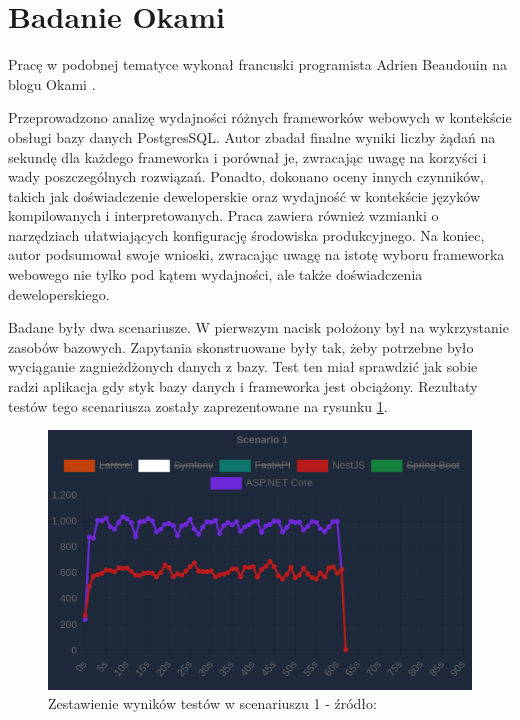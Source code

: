 \section{Badanie Okami}
Pracę w podobnej tematyce wykonał francuski programista Adrien Beaudouin na blogu Okami \cite{okami1012024Benchmark}.

Przeprowadzono analizę wydajności różnych frameworków webowych w kontekście obsługi bazy danych PostgresSQL.
Autor zbadał finalne wyniki liczby żądań na sekundę dla każdego frameworka i porównał je, zwracając uwagę na korzyści i wady poszczególnych rozwiązań. 
Ponadto, dokonano oceny innych czynników, takich jak doświadczenie deweloperskie oraz wydajność w kontekście języków kompilowanych i interpretowanych.
Praca zawiera również wzmianki o narzędziach ułatwiających konfigurację środowiska produkcyjnego.
Na koniec, autor podsumował swoje wnioski, zwracając uwagę na istotę wyboru frameworka webowego nie tylko pod kątem wydajności, ale także doświadczenia deweloperskiego.

Badane były dwa scenariusze.
W pierwszym nacisk położony był na wykrzystanie zasobów bazowych. 
Zapytania skonstruowane były tak, żeby potrzebne było wyciąganie zagnieżdżonych danych z bazy.
Test ten miał sprawdzić jak sobie radzi aplikacja gdy styk bazy danych i frameworka jest obciążony.
Rezultaty testów tego scenariusza zostały zaprezentowane na rysunku \ref{rys:oklatest1}.
\begin{figure}[!hb]
	\centering \includegraphics[width=1\linewidth]{rysunki/okla_test_1.png}
	\caption{Zestawienie wyników testów w scenariuszu 1 - źródło: \cite{okami1012024Benchmark}}
	\label{rys:oklatest1}
\end{figure}


